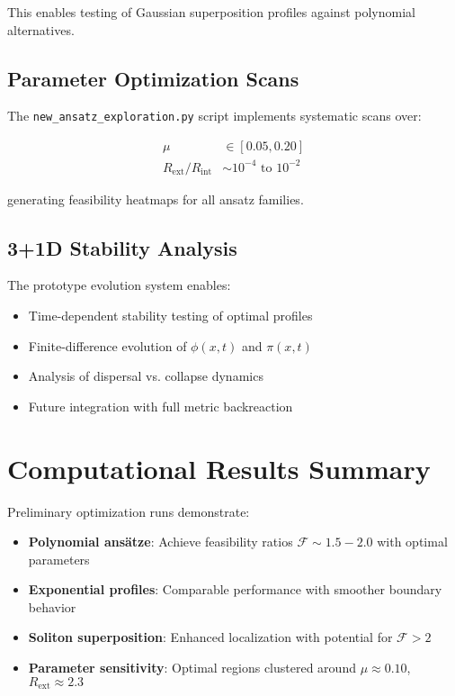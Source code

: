 \documentclass[12pt,a4paper]{article}
\begin{document}
This enables testing of Gaussian superposition profiles against polynomial alternatives.

\subsection{Parameter Optimization Scans}

The \texttt{new\_ansatz\_exploration.py} script implements systematic scans over:

\begin{align}
\mu &\in [0.05, 0.20] \\
R_{\text{ext}}/R_{\text{int}} &\sim 10^{-4} \text{ to } 10^{-2}
\end{align}

generating feasibility heatmaps for all ansatz families.

\subsection{3+1D Stability Analysis}

The prototype evolution system enables:

\begin{itemize}
\item Time-dependent stability testing of optimal profiles
\item Finite-difference evolution of $\phi(x,t)$ and $\pi(x,t)$
\item Analysis of dispersal vs. collapse dynamics
\item Future integration with full metric backreaction
\end{itemize}

\section{Computational Results Summary}

Preliminary optimization runs demonstrate:

\begin{itemize}
\item \textbf{Polynomial ansätze}: Achieve feasibility ratios $\mathcal{F} \sim 1.5-2.0$ with optimal parameters
\item \textbf{Exponential profiles}: Comparable performance with smoother boundary behavior  
\item \textbf{Soliton superposition}: Enhanced localization with potential for $\mathcal{F} > 2$
\item \textbf{Parameter sensitivity}: Optimal regions clustered around $\mu \approx 0.10$, $R_{\text{ext}} \approx 2.3$
\end{itemize}
\end{document}

